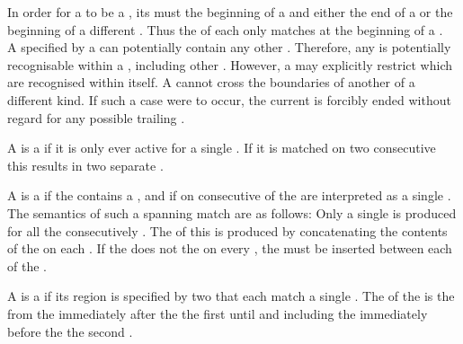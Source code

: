 In order for a  to be a , its  must  the beginning of a  and either the end of a  or the beginning of a different . Thus the  of each  only matches at the beginning of a .\\

A  specified by a  can potentially contain any other . Therefore, any  is potentially recognisable within a , including other . However, a  may explicitly restrict which  are recognised within itself. A  cannot cross the boundaries of another  of a different kind. If such a case were to occur, the current  is forcibly ended without regard for any possible trailing .

A  is a  if it is only ever active for a single . If it is matched on two consecutive  this results in two separate .

A  is a  if the  contains a , and if  on consecutive  of the  are interpreted as a single . The semantics of such a spanning match are as follows: Only a single  is produced for all the consecutively  . The  of this  is produced by concatenating the contents of the  on each . If the  does not  the  on every , the  must be inserted between each  of the .

A  is a  if its  region is specified by two  that each match a single . The  of the  is the  from the  immediately after the  the first   until and including the  immediately before the  the second  .




% 
% 
% 
% 
% 
% 

